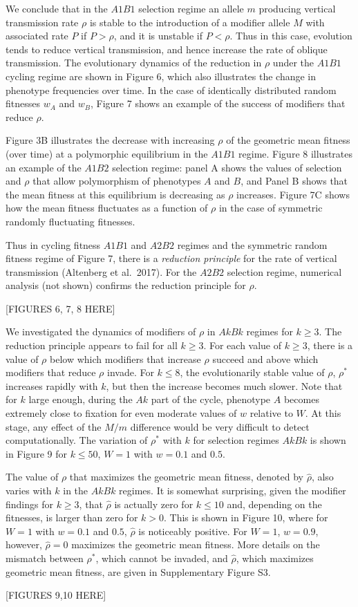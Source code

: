  We conclude that in the $A1B1$ selection regime an allele $m$ producing vertical transmission rate $\rho$ is stable to the introduction of a modifier allele $M$ with associated rate $P$ if $P>\rho$, and it is unstable if $P<\rho$. Thus in this case, evolution tends to reduce vertical transmission, and hence increase the rate of oblique transmission. The evolutionary dynamics of the reduction in $\rho$ under the $A1B1$ cycling regime are shown in Figure 6, which also illustrates the change in phenotype frequencies over time. In the case of identically distributed random fitnesses $w_A$ and $w_B$, Figure 7 shows  an example of the success of modifiers that reduce $\rho$. 
  
 Figure 3B illustrates the decrease with increasing $\rho$ of the geometric mean fitness (over time) at a polymorphic equilibrium  in the $A1B1$ regime. Figure 8 illustrates an example of the $A1B2$ selection regime: panel A shows the values of selection and $\rho$ that allow polymorphism of phenotypes $A$ and $B$, and Panel B shows that the mean fitness at this equilibrium is decreasing as $\rho$ increases. Figure 7C shows how the mean fitness fluctuates as a function of $\rho$ in the case of symmetric randomly fluctuating fitnesses.
 
 Thus in  cycling fitness  $A1B1$ and  $A2B2$ regimes and the symmetric random fitness regime of Figure 7, there is a {\sl reduction principle} for the rate of vertical transmission (Altenberg et al.\ 2017). For the $A2B2$ selection regime, numerical analysis (not shown) confirms the reduction principle for $\rho$.
  \medskip
\centerline{[FIGURES 6, 7,  8 HERE]}  

 We investigated the dynamics of modifiers of $\rho$ in $AkBk$ regimes for $k\ge 3$. The reduction principle appears to fail for all $k\ge 3$. For each value of $k\ge 3$, there is a value of $\rho$ below which modifiers that increase $\rho$ succeed and above which modifiers that reduce $\rho$ invade. For $k\le8$, the evolutionarily stable value of $\rho$, $\rho^*$  increases rapidly with $k$, but then the increase  becomes much slower. Note that for $k$ large enough, during the $Ak$ part of the cycle, phenotype $A$ becomes extremely close to fixation for even moderate values of $w$ relative to $W$. At this stage, any effect of the $M/m$ difference would be very difficult to detect computationally. The variation of $\rho^*$ with $k$ for selection regimes $AkBk$ is shown in Figure 9 for $k\le50$, $W=1$ with $w=0.1$ and $0.5$.
 
 The value of $\rho$ that maximizes the geometric mean fitness, denoted by $\hat\rho$, also varies with $k$ in the $AkBk$ regimes. It is somewhat surprising, given the modifier findings for $k\ge 3$, that $\hat\rho$ is actually zero for $k\le10$ and, depending on the fitnesses, is larger than zero for $k>0$. This is shown in Figure 10, where for $W=1$ with $w=0.1$ and $0.5$, $\hat\rho$ is noticeably positive. For $W=1$, $w=0.9$, however, $\hat\rho=0$ maximizes the geometric mean fitness. More details on the mismatch between $\rho^*$, which cannot be invaded, and $\hat\rho$, which maximizes geometric mean fitness, are given in Supplementary Figure S3. 
\medskip
\centerline{[FIGURES 9,10 HERE]}  
 \bigskip
 

